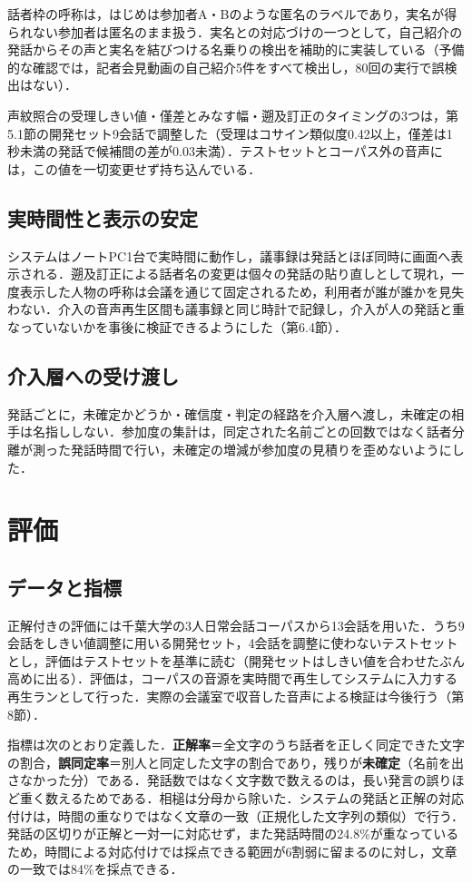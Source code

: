\documentclass[a4paper]{ltjsarticle}
\begin{document}
話者枠の呼称は，はじめは参加者A・Bのような匿名のラベルであり，実名が得られない参加者は匿名のまま扱う．実名との対応づけの一つとして，自己紹介の発話からその声と実名を結びつける名乗りの検出を補助的に実装している（予備的な確認では，記者会見動画の自己紹介5件をすべて検出し，80回の実行で誤検出はない）．

声紋照合の受理しきい値・僅差とみなす幅・遡及訂正のタイミングの3つは，第5.1節の開発セット9会話で調整した（受理はコサイン類似度0.42以上，僅差は1秒未満の発話で候補間の差が0.03未満）．テストセットとコーパス外の音声には，この値を一切変更せず持ち込んでいる．

\subsection{実時間性と表示の安定}
システムはノートPC1台で実時間に動作し，議事録は発話とほぼ同時に画面へ表示される．遡及訂正による話者名の変更は個々の発話の貼り直しとして現れ，一度表示した人物の呼称は会議を通じて固定されるため，利用者が誰が誰かを見失わない．介入の音声再生区間も議事録と同じ時計で記録し，介入が人の発話と重なっていないかを事後に検証できるようにした（第6.4節）．

\subsection{介入層への受け渡し}
発話ごとに，未確定かどうか・確信度・判定の経路を介入層へ渡し，未確定の相手は名指ししない．参加度の集計は，同定された名前ごとの回数ではなく話者分離が測った発話時間で行い，未確定の増減が参加度の見積りを歪めないようにした．

\section{評価}
\subsection{データと指標}
正解付きの評価には千葉大学の3人日常会話コーパス\cite{chiba}から13会話を用いた．うち9会話をしきい値調整に用いる開発セット，4会話を調整に使わないテストセットとし，評価はテストセットを基準に読む（開発セットはしきい値を合わせたぶん高めに出る）．評価は，コーパスの音源を実時間で再生してシステムに入力する再生ランとして行った．実際の会議室で収音した音声による検証は今後行う（第8節）．

指標は次のとおり定義した．\textbf{正解率}＝全文字のうち話者を正しく同定できた文字の割合，\textbf{誤同定率}＝別人と同定した文字の割合であり，残りが\textbf{未確定}（名前を出さなかった分）である．発話数ではなく文字数で数えるのは，長い発言の誤りほど重く数えるためである．相槌は分母から除いた．システムの発話と正解の対応付けは，時間の重なりではなく文章の一致（正規化した文字列の類似）で行う．発話の区切りが正解と一対一に対応せず，また発話時間の24.8\%が重なっているため，時間による対応付けでは採点できる範囲が6割弱に留まるのに対し，文章の一致では84\%を採点できる．
\end{document}
